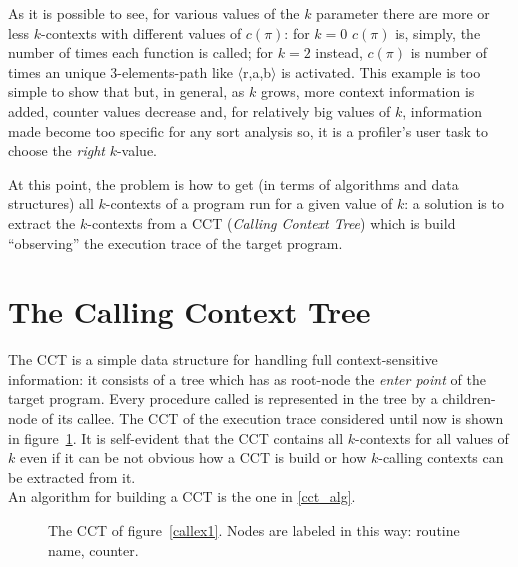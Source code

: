 \documentclass[a4paper,10pt]{report}
\begin{document}
As it is possible to see, for various values of the $k$ parameter there are more or less $k$-contexts with different values of $c(\pi)$: for $k=0$ $c(\pi)$ is, simply, the number of times each function is called; for $k=2$ instead, $c(\pi)$ is number of times an unique 3-elements-path like $\langle$r,a,b$\rangle$ is activated. This example is too simple to show that but, in general, as $k$ grows, more context information is added, counter values decrease and, for relatively big values of $k$, information made become too specific for any sort analysis so, it is a profiler's user task to choose the \emph{right} $k$-value.

At this point, the problem is how to get (in terms of algorithms and data
structures) all $k$-contexts of a program run for a given value of $k$: a solution is to extract the $k$-contexts from a CCT (\emph{Calling Context Tree}) which is build
``observing'' the execution trace of the target program.

\section{The Calling Context Tree}

The CCT is a simple data structure for handling full context-sensitive information: 
it consists of a tree which has as root-node the \emph{enter point} of the target program.
Every procedure called is represented in the tree by a children-node of its callee. 
The CCT of the execution trace considered until now is shown in figure~\ref{cct1}.
It is self-evident that the CCT contains all $k$-contexts for all values of $k$ even if 
it can be not obvious how a CCT is build or how $k$-calling contexts can be extracted from it.\\
An algorithm for building a CCT is the one in \cref{cct_alg}.


\begin{figure}[H]

\begin{center}
\end{center}

\caption{The CCT of figure~\ref{callex1}. Nodes are labeled in this way: routine name, counter.}
\label{cct1}

\end{figure}
\end{document}
